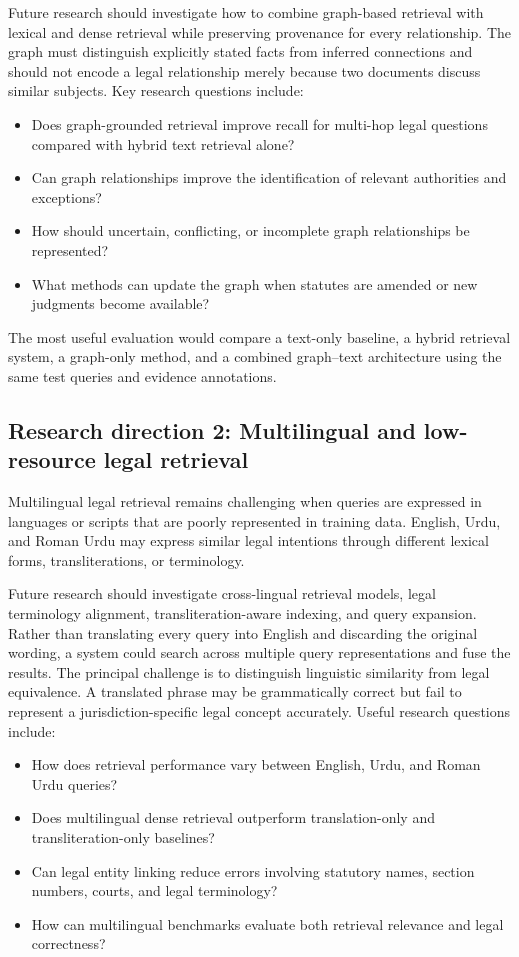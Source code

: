 Future research should investigate how to combine graph-based retrieval with lexical and dense retrieval
while preserving provenance for every relationship. The graph must distinguish explicitly stated facts
from inferred connections and should not encode a legal relationship merely because two documents discuss
similar subjects. Key research questions include:
\begin{itemize}[leftmargin=1.4em, itemsep=2pt, topsep=2pt]
\item Does graph-grounded retrieval improve recall for multi-hop legal questions compared with hybrid
text retrieval alone?
\item Can graph relationships improve the identification of relevant authorities and exceptions?
\item How should uncertain, conflicting, or incomplete graph relationships be represented?
\item What methods can update the graph when statutes are amended or new judgments become available?
\end{itemize}

The most useful evaluation would compare a text-only baseline, a hybrid retrieval system, a graph-only
method, and a combined graph--text architecture using the same test queries and evidence annotations.

\subsection{Research direction 2: Multilingual and low-resource legal retrieval}

Multilingual legal retrieval remains challenging when queries are expressed in languages or scripts that
are poorly represented in training data. English, Urdu, and Roman Urdu may express similar legal
intentions through different lexical forms, transliterations, or terminology.

Future research should investigate cross-lingual retrieval models, legal terminology alignment,
transliteration-aware indexing, and query expansion. Rather than translating every query into English and
discarding the original wording, a system could search across multiple query representations and fuse the
results. The principal challenge is to distinguish linguistic similarity from legal equivalence. A
translated phrase may be grammatically correct but fail to represent a jurisdiction-specific legal concept
accurately. Useful research questions include:
\begin{itemize}[leftmargin=1.4em, itemsep=2pt, topsep=2pt]
\item How does retrieval performance vary between English, Urdu, and Roman Urdu queries?
\item Does multilingual dense retrieval outperform translation-only and transliteration-only baselines?
\item Can legal entity linking reduce errors involving statutory names, section numbers, courts, and
legal terminology?
\item How can multilingual benchmarks evaluate both retrieval relevance and legal correctness?
\end{itemize}

